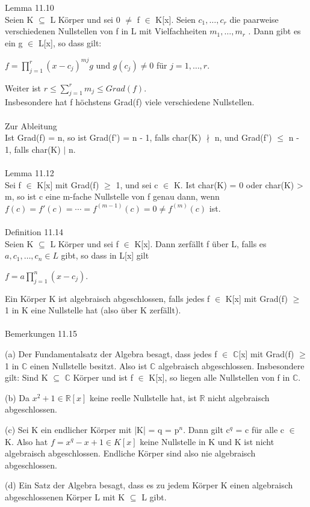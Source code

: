 \documentclass[fontsize=10pt]{scrartcl}
\begin{document}
Lemma 11.10\\
Seien K $\subseteq$ L Körper und sei 0 $\neq$ f $\in$ K[x]. Seien $c_1, …, c_r$ die paarweise verschiedenen Nullstellen von f in L mit Vielfachheiten $m_1 , …, m_r$ . Dann gibt es ein g $\in$ L[x], so dass gilt:
\begin{center}
$f = \prod\limits_{j=1}^{r} (x - c_j)^{mj} g$ und $g(c_j) \neq 0$ für $j = 1, …, r$.
\end{center}
Weiter ist $r \le \sum\nolimits_{j=1}^{r}m_j \le Grad(f)$.\\
Insbesondere hat f höchstens Grad(f) viele verschiedene Nullstellen.\\
\\
Zur Ableitung\\
Ist Grad(f) = n, so ist Grad(f') = n - 1, falls char(K) $\nmid$ n, und Grad(f') $\le$ n - 1, falls char(K) $\mid$ n.\\
\\
Lemma 11.12\\
Sei f $\in$ K[x] mit Grad(f) $\ge$ 1, und sei c $\in$ K. Ist char(K) = 0 oder char(K) > m, so ist c eine m-fache Nullstelle von f genau dann, wenn $f(c) = f'(c) = \cdots = f^{(m-1)}(c) = 0 \neq f^{(m)}(c)$ ist.\\
\\
Definition 11.14\\
Seien K $\subseteq$ L Körper und sei f $\in$ K[x]. Dann zerfällt f über L, falls es $a, c_1, …, c_n \in L$ gibt, so dass in L[x] gilt
\begin{center}
$f = a \prod\limits_{j=1}^{n}(x - c_j)$.
\end{center}
Ein Körper K ist algebraisch abgeschlossen, falls jedes f $\in$ K[x] mit Grad(f) $\ge$ 1 in K eine Nullstelle hat (also über K zerfällt).\\
\\
Bemerkungen 11.15
\begin{compactenum}
\item[(a)] Der Fundamentalsatz der Algebra besagt, dass jedes f $\in$ $\mathbb{C}$[x] mit Grad(f) $\ge$ 1 in $\mathbb{C}$ einen Nullstelle besitzt. Also ist $\mathbb{C}$ algebraisch abgeschlossen. Insbesondere gilt: Sind K $\subseteq$ $\mathbb{C}$ Körper und ist f $\in$ K[x], so liegen alle Nullstellen von f in $\mathbb{C}$.
\item[(b)] Da $x^2 + 1 \in \mathbb{R}[x]$ keine reelle Nullstelle hat, ist $\mathbb{R}$ nicht algebraisch abgeschlossen.
\item[(c)] Sei K ein endlicher Körper mit |K| = q = p$^n$. Dann gilt c$^q$ = c für alle c $\in$ K. Also hat $f = x^q - x+1 \in K[x]$ keine Nullstelle in K und K ist nicht algebraisch abgeschlossen. Endliche Körper sind also nie algebraisch abgeschlossen.
\item[(d)] Ein Satz der Algebra besagt, dass es zu jedem Körper K einen algebraisch abgeschlossenen Körper L mit K $\subseteq$ L gibt.\\
\end{compactenum}
\end{document}

